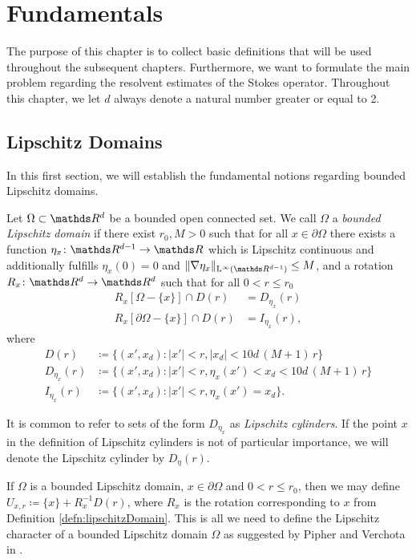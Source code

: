 \chapter{Fundamentals}
\label{chap:1}

The purpose of this chapter is to collect basic definitions that will be used throughout the subsequent chapters. Furthermore, we want to formulate the main problem regarding the resolvent estimates of the Stokes operator.
Throughout this chapter, we let $d$ always denote a natural number greater or equal to 2.

\section{Lipschitz Domains}

In this first section, we will establish the fundamental notions regarding bounded Lipschitz domains.

\begin{defn}
  \label{defn:lipschitzDomain}
  Let $\Omega \subset \R^d$ be a bounded open connected set.
  We call $\Omega$ a \emph{bounded Lipschitz domain} if there exist $r_0, M > 0$ such that for all $x \in \partial\Omega$ there exists a function $\eta_x \colon \R^{d - 1} \to \R$ which is Lipschitz continuous and additionally fulfills $\eta_x(0) = 0$ and $\|\nabla \eta_x \|_{\Ell^\infty(\R^{d - 1})} \leq M$, and a rotation $R_x \colon \R^d \to \R^d$ such that for all $0 < r \leq r_0$ 
  \begin{align*}
    R_x[ \Omega - \{x\} ] \cap D(r) &= D_{\eta_x}(r) \\
    R_x[\partial\Omega - \{x\}] \cap D(r) &= I_{\eta_x}(r),
  \end{align*}
  where
  \begin{align*}
    D(r) &\coloneqq \big\{ (x', x_d) \colon |x'| < r, |x_d| < 10 d\, (M + 1)\, r\big\} \\
    D_{\eta_x}(r) &\coloneqq \big\{ (x', x_d) \colon |x'| < r, \eta_x(x') < x_d < 10 d\,(M+ 1)\,r\big\} \\
    I_{\eta_x}(r) &\coloneqq \big\{ (x', x_d) \colon |x'| < r, \eta_x(x') = x_d \big\} .
  \end{align*}
\end{defn}
  It is common to refer to sets of the form $D_{\eta_x}$ as \emph{Lipschitz cylinders}. If the point $x$ in the definition of Lipschitz cylinders is not of particular importance, we will denote the Lipschitz cylinder by $D_{\eta}(r)$.

  If $\Omega$ is a bounded Lipschitz domain, $x \in \partial\Omega$ and $0 < r \leq r_0$, then we may define $U_{x,r} \coloneqq \{ x\} + R_x^{-1} D(r)$, where $R_x$ is the rotation corresponding to $x$ from Definition \ref{defn:lipschitzDomain}.
  This is all we need to define the Lipschitz character of a bounded Lipschitz domain $\Omega$ as suggested by Pipher and Verchota in \cite[Sec.\@~5]{pipherVerchota}.

